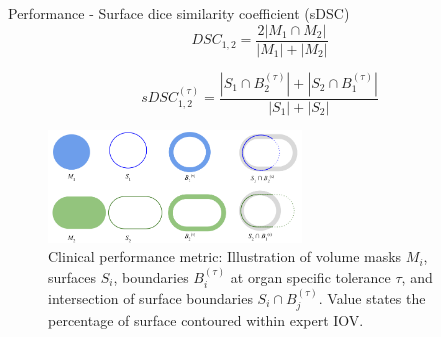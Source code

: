 \documentclass[9pt]{beamer}
\begin{document}
\begin{frame}{Performance - Surface dice similarity coefficient (sDSC)}
  \begin{equation*}
    DSC_{1,2} = \frac{2|M_{1} \cap M_{2}|}{|M_{1}| + |M_{2}|}
    \label{eq:sDSC}
  \end{equation*}

  \vspace{4mm}

  \begin{equation*}
    sDSC_{1,2}^{(\tau)} = \frac{|S_{1} \cap B_{2}^{(\tau)}| + |S_{2} \cap B_{1}^{(\tau)}|}{|S_{1}| + |S_{2}|}
    \label{eq:sDSC}
  \end{equation*}

  \vspace{4mm}
  \begin{figure}
    \includegraphics[width=0.6\textwidth]{images/sDSC}
    \caption{Clinical performance metric: Illustration of volume masks $M_{i}$, surfaces $S_{i}$, boundaries $B_{i}^{(\tau)}$ at organ specific tolerance $\tau$, and intersection of surface boundaries $S_{i} \cap B_{j}^{(\tau)}$. Value states the percentage of surface contoured within expert IOV.\footnotemark[3]}
  \end{figure}
\end{frame}

%
\end{document}
